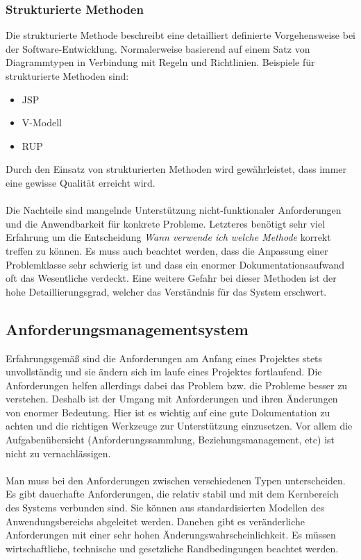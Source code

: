 \subsubsection{Strukturierte Methoden}
Die strukturierte Methode beschreibt eine detailliert definierte Vorgehensweise bei der Software-Entwicklung. Normalerweise basierend auf einem Satz von Diagrammtypen in Verbindung mit Regeln und Richtlinien. Beispiele für strukturierte Methoden sind:
\begin{itemize}
\item JSP
\item V-Modell
\item RUP
\end{itemize}

Durch den Einsatz von strukturierten Methoden wird gewährleistet, dass immer eine gewisse Qualität erreicht wird. 
\\\\
Die Nachteile sind mangelnde Unterstützung nicht-funktionaler Anforderungen und die Anwendbarkeit für konkrete Probleme. Letzteres benötigt sehr viel Erfahrung um die Entscheidung \textit{Wann verwende ich welche Methode} korrekt treffen zu können. Es muss auch beachtet werden, dass die Anpassung einer Problemklasse sehr schwierig ist und dass ein enormer Dokumentationsaufwand oft das Wesentliche verdeckt. Eine weitere Gefahr bei dieser Methoden ist der hohe  Detaillierungsgrad, welcher das Verständnis für das System erschwert.

\subsection{Anforderungsmanagementsystem}
Erfahrungsgemäß sind die Anforderungen am Anfang eines Projektes stets unvollständig und sie ändern sich im laufe eines Projektes fortlaufend. Die Anforderungen helfen allerdings dabei das Problem bzw. die Probleme besser zu verstehen. Deshalb ist der Umgang mit Anforderungen und ihren Änderungen von enormer Bedeutung.  Hier ist es wichtig auf eine gute Dokumentation zu achten und die richtigen Werkzeuge zur Unterstützung einzusetzen. Vor allem die Aufgabenübersicht (Anforderungssammlung, Beziehungsmanagement, etc) ist nicht zu vernachlässigen.
\\\\
Man muss bei den Anforderungen zwischen verschiedenen Typen unterscheiden. Es gibt dauerhafte Anforderungen, die relativ stabil und mit dem Kernbereich des Systems verbunden sind. Sie können aus standardisierten Modellen des Anwendungsbereichs abgeleitet werden. Daneben gibt es veränderliche Anforderungen mit einer sehr hohen Änderungswahrscheinlichkeit. Es müssen wirtschaftliche, technische und gesetzliche Randbedingungen beachtet werden. 